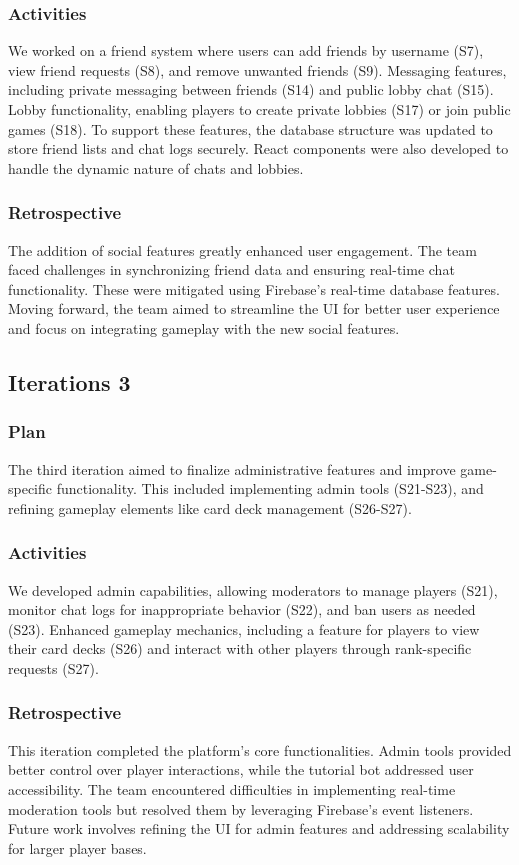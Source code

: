 \subsubsection{Activities}
We worked on a friend system where users can add friends by username (S7), view friend requests (S8), and remove unwanted friends (S9).
Messaging features, including private messaging between friends (S14) and public lobby chat (S15). Lobby functionality, enabling players to create private lobbies (S17) or join public games (S18). To support these features, the database structure was updated to store friend lists and chat logs securely. React components were also developed to handle the dynamic nature of chats and lobbies.

\subsubsection{Retrospective}
The addition of social features greatly enhanced user engagement. The team faced challenges in synchronizing friend data and ensuring real-time chat functionality. These were mitigated using Firebase’s real-time database features. Moving forward, the team aimed to streamline the UI for better user experience and focus on integrating gameplay with the new social features.

\subsection{Iterations 3}

\subsubsection{Plan}
The third iteration aimed to finalize administrative features and improve game-specific functionality. This included implementing admin tools (S21-S23), and refining gameplay elements like card deck management (S26-S27).

\subsubsection{Activities}
We developed admin capabilities, allowing moderators to manage players (S21), monitor chat logs for inappropriate behavior (S22), and ban users as needed (S23). Enhanced gameplay mechanics, including a feature for players to view their card decks (S26) and interact with other players through rank-specific requests (S27). 
\subsubsection{Retrospective}
This iteration completed the platform’s core functionalities. Admin tools provided better control over player interactions, while the tutorial bot addressed user accessibility. The team encountered difficulties in implementing real-time moderation tools but resolved them by leveraging Firebase’s event listeners. Future work involves refining the UI for admin features and addressing scalability for larger player bases.



